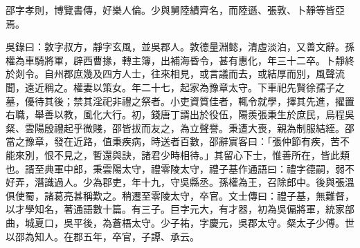
\begin{pinyinscope}
邵字孝則，博覽書傳，好樂人倫。少與舅陸績齊名，而陸遜、張敦、卜靜等皆亞焉。

吳錄曰：敦字叔方，靜字玄風，並吳郡人。敦德量淵懿，清虛淡泊，又善文辭。孫權為車騎將軍，辟西曹掾，轉主簿，出補海昏令，甚有惠化，年三十二卒。卜靜終於剡令。自州郡庶幾及四方人士，往來相見，或言議而去，或結厚而別，風聲流聞，遠近稱之。權妻以策女。年二十七，起家為豫章太守。下車祀先賢徐孺子之墓，優待其後；禁其淫祀非禮之祭者。小吏資質佳者，輒令就學，擇其先進，擢置右職，舉善以教，風化大行。初，錢唐丁諝出於役伍，陽羨張秉生於庶民，烏程吳粲、雲陽殷禮起乎微賤，邵皆拔而友之，為立聲譽。秉遭大喪，親為制服結絰。邵當之豫章，發在近路，值秉疾病，時送者百數，邵辭賔客曰：「張仲節有疾，苦不能來別，恨不見之，暫還與訣，諸君少時相待。」其留心下士，惟善所在，皆此類也。諝至典軍中郎，秉雲陽太守，禮零陵太守，禮子基作通語曰：禮字德嗣，弱不好弄，潛識過人。少為郡吏，年十九，守吳縣丞。孫權為王，召除郎中。後與張溫俱使蜀，諸葛亮甚稱歎之。稍遷至零陵太守，卒官。文士傳曰：禮子基，無難督，以才學知名，著通語數十篇。有三子。巨字元大，有才器，初為吳偏將軍，統家部曲，城夏口，吳平後，為蒼梧太守。少子祐，字慶元，吳郡太守。粲太子少傅。世以邵為知人。在郡五年，卒官，子譚、承云。


\end{pinyinscope}